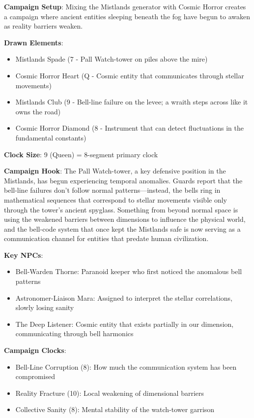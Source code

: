\documentclass[11pt]{article}
\begin{document}
\begin{mdframed}[backgroundcolor=horrorbg]
\textbf{Campaign Setup}:
Mixing the Mistlands generator with Cosmic Horror creates a campaign where ancient entities sleeping beneath the fog have begun to awaken as reality barriers weaken.

\textbf{Drawn Elements}:
\begin{itemize}[leftmargin=*]
\item Mistlands Spade (7 - Pall Watch-tower on piles above the mire)
\item Cosmic Horror Heart (Q - Cosmic entity that communicates through stellar movements)
\item Mistlands Club (9 - Bell-line failure on the levee; a wraith steps across like it owns the road)
\item Cosmic Horror Diamond (8 - Instrument that can detect fluctuations in the fundamental constants)
\end{itemize}

\textbf{Clock Size}: 9 (Queen) = 8-segment primary clock

\textbf{Campaign Hook}:
The Pall Watch-tower, a key defensive position in the Mistlands, has begun experiencing temporal anomalies. Guards report that the bell-line failures don't follow normal patterns—instead, the bells ring in mathematical sequences that correspond to stellar movements visible only through the tower's ancient spyglass. Something from beyond normal space is using the weakened barriers between dimensions to influence the physical world, and the bell-code system that once kept the Mistlands safe is now serving as a communication channel for entities that predate human civilization.

\textbf{Key NPCs}:
\begin{itemize}[leftmargin=*]
\item Bell-Warden Thorne: Paranoid keeper who first noticed the anomalous bell patterns
\item Astronomer-Liaison Mara: Assigned to interpret the stellar correlations, slowly losing sanity
\item The Deep Listener: Cosmic entity that exists partially in our dimension, communicating through bell harmonics
\end{itemize}

\textbf{Campaign Clocks}:
\begin{itemize}[leftmargin=*]
\item Bell-Line Corruption (8): How much the communication system has been compromised
\item Reality Fracture (10): Local weakening of dimensional barriers
\item Collective Sanity (8): Mental stability of the watch-tower garrison
\end{itemize}


\end{mdframed}
\end{document}
